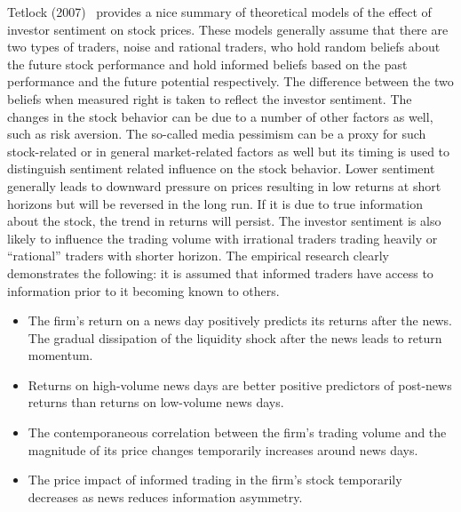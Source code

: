  
 Tetlock (2007)~\cite{tetlock2007giving} provides a nice summary of theoretical models of the effect of investor sentiment on stock prices. These models generally assume that there are two types of traders, noise and rational traders, who hold random beliefs about the future stock performance and hold informed beliefs based on the past performance and the future potential respectively. The difference between the two beliefs when measured right is taken to reflect the investor sentiment. The changes in the stock behavior can be due to a number of other factors as well, such as risk aversion. The so-called media pessimism can be a proxy for such stock-related or in general market-related factors as well but its timing is used to distinguish sentiment related influence on the stock behavior. Lower sentiment generally leads to downward pressure on prices resulting in low returns at short horizons but will be reversed in the long run. If it is due to true information about the stock, the trend in returns will persist. The investor sentiment is also likely to influence the trading volume with irrational traders trading heavily or ``rational'' traders with shorter horizon. The empirical research clearly demonstrates the following: it is assumed that informed traders have access to information prior to it becoming known to others.
 	\begin{itemize}
	\item The firm's return on a news day positively predicts its returns after the news. The gradual dissipation of the liquidity shock after the news leads to return momentum.
	\item Returns on high-volume news days are better positive predictors of post-news returns than returns on low-volume news days.
	\item The contemporaneous correlation between the firm's trading volume and the magnitude of its price changes temporarily increases around news days.
	\item The price impact of informed trading in the firm's stock temporarily decreases as news reduces information asymmetry. 
	\end{itemize}
 
